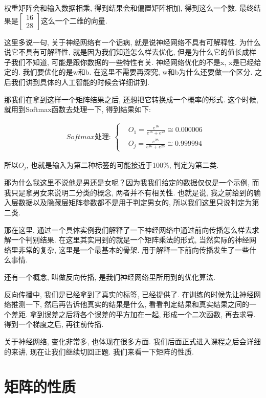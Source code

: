 权重矩阵会和输入数据相乘, 得到结果会和偏置矩阵相加, 得到这么一个数. 最终结果是$\begin{bmatrix} 16 \\ 28 \end{bmatrix}$这么一个二维的向量. 

这里多说一句, 关于神经网络有一个诟病, 就是说神经网络不具有可解释性. 为什么说它不具有可解释性, 就是因为我们知道怎么样去优化, 但是为什么它的值长成样子我们不知道, 可能是跟你数据的一些特性有关. 神经网络优化的不是x, x是已经给定的. 我们要优化的是w和b. 在这里不需要再深究, w和b为什么还要做一个区分. 之后我们讲到具体的人工智能的时候会详细讲到. 

那我们在拿到这样一个矩阵结果之后, 还想把它转换成一个概率的形式. 这个时候, 就用到Softmax函数去处理一下, 得到结果如下: 

\begin{align*}
  & Softmax \mbox{处理: } \begin{cases}
  & O_1 = \frac{e^{16}}{e^{16} + e^{28}} \cong 0.000006 \\ & O_j = \frac{e^{28}}{e^{16} + e^{28}} \cong 0.999994
  \end{cases}
\end{align*}

所以$O_j$, 也就是输入为第二种标签的可能接近于100\%,  判定为第二类. 

那为什么我这里不说他是男还是女呢？因为我我们给定的数据仅仅是一个示例, 而我只是拿男女来说明二分类的概念, 两者并不有相关性. 也就是说, 我之前给到的输入层数据以及隐藏层矩阵参数都不是用于判定男女的, 所以我们这里只说判定为第二类. 

那在这里, 通过一个具体实例我们解释了一下神经网络中通过前向传播怎么样去求解一个判别结果. 在这里其实用到的就是一个矩阵乘法的形式, 当然实际的神经网络里非常的复杂, 这里是一个最基本的骨架. 用于解释一下前向传播发生了一些什么事情. 

还有一个概念, 叫做反向传播, 是我们神经网络里所用到的优化算法. 

反向传播中, 我们是已经拿到了真实的标签, 已经提供了. 在训练的时候先让神经网络推测一下, 然后再告诉他真实的结果是什么, 看看判定结果和真实结果之间的一个差距. 拿到误差之后将各个误差的平方加在一起, 形成一个二次函数, 再去求导. 得到一个梯度之后, 再往前传播. 

关于神经网络, 变化非常多, 也体现在很多方面. 我们后面正式进入课程之后会详细的来讲, 现在让我们继续切回正题. 我们来看一下矩阵的性质. 

\section{矩阵的性质}

